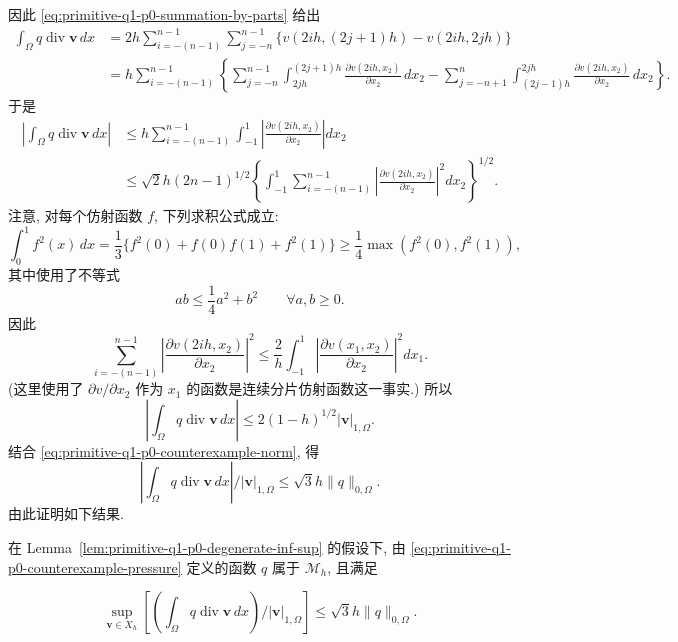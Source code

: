 
因此 \eqref{eq:primitive-q1-p0-summation-by-parts} 给出
\[
\begin{aligned}
\int_\Omega q\operatorname{div}\mathbf v\,dx
&=2h\sum_{i=-(n-1)}^{n-1}\sum_{j=-n}^{n-1}
\{v(2ih,(2j+1)h)-v(2ih,2jh)\}\\
&=h\sum_{i=-(n-1)}^{n-1}
\left\{\sum_{j=-n}^{n-1}\int_{2jh}^{(2j+1)h}
\frac{\partial v(2ih,x_2)}{\partial x_2}\,dx_2
-\sum_{j=-n+1}^{n}\int_{(2j-1)h}^{2jh}
\frac{\partial v(2ih,x_2)}{\partial x_2}\,dx_2\right\}.
\end{aligned}
\]
于是
\[
\begin{aligned}
\left|\int_\Omega q\operatorname{div}\mathbf v\,dx\right|
&\leq h\sum_{i=-(n-1)}^{n-1}\int_{-1}^{1}
\left|\frac{\partial v(2ih,x_2)}{\partial x_2}\right|dx_2\\
&\leq\sqrt2h(2n-1)^{1/2}
\left\{\int_{-1}^{1}\sum_{i=-(n-1)}^{n-1}
\left|\frac{\partial v(2ih,x_2)}{\partial x_2}\right|^2dx_2\right\}^{1/2}.
\end{aligned}
\]
注意, 对每个仿射函数 $f$, 下列求积公式成立:
\[
\int_0^1f^2(x)\,dx
=\frac13\{f^2(0)+f(0)f(1)+f^2(1)\}
\geq\frac14\max(f^2(0),f^2(1)),
\]
其中使用了不等式
\[
ab\leq\frac14a^2+b^2\qquad\forall a,b\geq0.
\]
因此
\[
\sum_{i=-(n-1)}^{n-1}
\left|\frac{\partial v(2ih,x_2)}{\partial x_2}\right|^2
\leq\frac2h\int_{-1}^{1}
\left|\frac{\partial v(x_1,x_2)}{\partial x_2}\right|^2dx_1.
\]
(这里使用了 $\partial v/\partial x_2$ 作为 $x_1$ 的函数是连续分片仿射函数这一事实.)
所以
\[
\left|\int_\Omega q\operatorname{div}\mathbf v\,dx\right|
\leq2(1-h)^{1/2}|\mathbf v|_{1,\Omega}.
\]
结合 \eqref{eq:primitive-q1-p0-counterexample-norm}, 得
\[
\left|\int_\Omega q\operatorname{div}\mathbf v\,dx\right|
/|\mathbf v|_{1,\Omega}
\leq\sqrt3h\|q\|_{0,\Omega}.
\]
由此证明如下结果.

\setcounter{statement}{5}
\renewcommand{\theHstatement}{lemma.\thesection.\arabic{statement}}
\begin{Lemma}\label{lem:primitive-q1-p0-sharpness}
在 Lemma~\ref{lem:primitive-q1-p0-degenerate-inf-sup} 的假设下,
由 \eqref{eq:primitive-q1-p0-counterexample-pressure} 定义的函数 $q$
属于 $\mathcal M_h$, 且满足

\[
\sup_{\mathbf v\in X_h}
\left[\left(\int_\Omega q\operatorname{div}\mathbf v\,dx\right)
/|\mathbf v|_{1,\Omega}\right]
\leq\sqrt3h\|q\|_{0,\Omega}.
\]
\end{Lemma}

